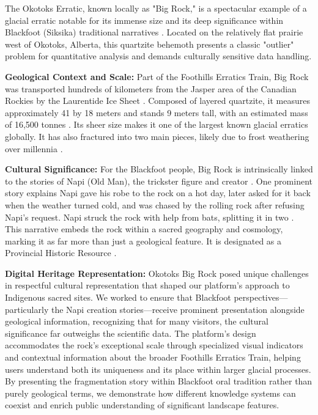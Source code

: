 The Okotoks Erratic, known locally as "Big Rock," is a spectacular example of a glacial erratic notable for its immense size and its deep significance within Blackfoot (Siksika) traditional narratives \cite{AlbertaOkotoks, Dempsey1997}. Located on the relatively flat prairie west of Okotoks, Alberta, this quartzite behemoth presents a classic "outlier" problem for quantitative analysis and demands culturally sensitive data handling.

\textbf{Geological Context and Scale:} Part of the Foothills Erratics Train, Big Rock was transported hundreds of kilometers from the Jasper area of the Canadian Rockies by the Laurentide Ice Sheet \cite{AlbertaOkotoks, Stalker1973}. Composed of layered quartzite, it measures approximately 41 by 18 meters and stands 9 meters tall, with an estimated mass of 16,500 tonnes \cite{AlbertaOkotoks}. Its sheer size makes it one of the largest known glacial erratics globally. It has also fractured into two main pieces, likely due to frost weathering over millennia \cite{Dempsey1997}.

\textbf{Cultural Significance:} For the Blackfoot people, Big Rock is intrinsically linked to the stories of Napi (Old Man), the trickster figure and creator \cite{Dempsey1997, Klassen1995}. One prominent story explains Napi gave his robe to the rock on a hot day, later asked for it back when the weather turned cold, and was chased by the rolling rock after refusing Napi's request. Napi struck the rock with help from bats, splitting it in two \cite{Dempsey1997}. This narrative embeds the rock within a sacred geography and cosmology, marking it as far more than just a geological feature. It is designated as a Provincial Historic Resource \cite{AlbertaOkotoks}.

\textbf{Digital Heritage Representation:} Okotoks Big Rock posed unique challenges in respectful cultural representation that shaped our platform's approach to Indigenous sacred sites. We worked to ensure that Blackfoot perspectives—particularly the Napi creation stories—receive prominent presentation alongside geological information, recognizing that for many visitors, the cultural significance far outweighs the scientific data. The platform's design accommodates the rock's exceptional scale through specialized visual indicators and contextual information about the broader Foothills Erratics Train, helping users understand both its uniqueness and its place within larger glacial processes. By presenting the fragmentation story within Blackfoot oral tradition rather than purely geological terms, we demonstrate how different knowledge systems can coexist and enrich public understanding of significant landscape features.

